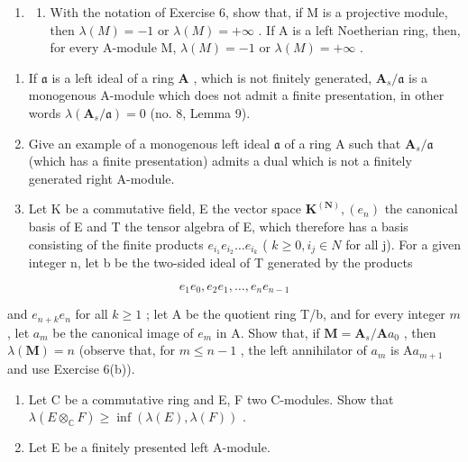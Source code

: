 \begin{enumerate}
\def\labelenumi{\arabic{enumi}.}
\setcounter{enumi}{6}
\tightlist
\item
  \begin{enumerate}
  \def\labelenumii{(\alph{enumii})}
  \tightlist
  \item
    With the notation of Exercise 6, show that, if M is a projective module, then \(\lambda(M) = -1\) or \(\lambda(M) = +\infty\) . If A is a left Noetherian ring, then, for every A-module M, \(\lambda(M) = -1\) or \(\lambda(M) = +\infty\) .
  \end{enumerate}
\end{enumerate}

\begin{enumerate}
\def\labelenumi{(\alph{enumi})}
\setcounter{enumi}{1}
\item
  If \(\mathfrak{a}\) is a left ideal of a ring \(\mathbf{A}\) , which is not finitely generated, \(\mathbf{A}_s / \mathfrak{a}\) is a monogenous A-module which does not admit a finite presentation, in other words \(\lambda(\mathbf{A}_s / \mathfrak{a}) = 0\) (no. 8, Lemma 9).
\item
  Give an example of a monogenous left ideal \(\mathfrak{a}\) of a ring A such that \(\mathbf{A}_s / \mathfrak{a}\) (which has a finite presentation) admits a dual which is not a finitely generated right A-module.
\item
  Let K be a commutative field, E the vector space \(\mathbf{K}^{(\mathbf{N})}, (e_n)\) the canonical basis of E and T the tensor algebra of E, which therefore has a basis consisting of the finite products \(e_{i_1}e_{i_2}\ldots e_{i_k}\) ( \(k \geqslant 0, i_j \in N\) for all j). For a given integer n, let b be the two-sided ideal of T generated by the products
\end{enumerate}

\[
e _ {1} e _ {0}, e _ {2} e _ {1}, \dots , e _ {n} e _ {n - 1}
\]

and \(e_{n+k}e_n\) for all \(k\geqslant 1\) ; let A be the quotient ring T/b, and for every integer \(m\) , let \(a_m\) be the canonical image of \(e_m\) in A. Show that, if \(\mathbf{M} = \mathbf{A}_s / \mathbf{A}a_0\) , then \(\lambda (\mathbf{M}) = n\) (observe that, for \(m\leqslant n - 1\) , the left annihilator of \(a_m\) is \(\mathrm{A}a_{m+1}\) and use Exercise 6(b)).

\begin{enumerate}
\def\labelenumi{\arabic{enumi}.}
\setcounter{enumi}{7}
\item
  Let C be a commutative ring and E, F two C-modules. Show that \(\lambda(E \otimes_{\mathbb{C}} F) \geqslant \inf(\lambda(E), \lambda(F))\) .
\item
  Let E be a finitely presented left A-module.
\end{enumerate}


